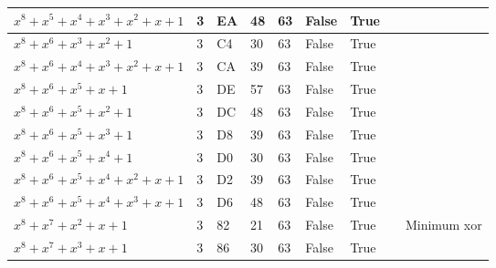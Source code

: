 \begin{footnotesize}
\begin{longtable}{|l|l|l|l|l|l|l|l|l|}
$x^8 + x^5 + x^4 + x^3 + x^2 + x + 1$   & 3             & EA                & 48                  & 63                    & False               & True              &              &                \\ \hline
$x^8 + x^6 + x^3 + x^2 + 1$             & 3             & C4                & 30                  & 63                    & False               & True              &              &                \\ \hline
$x^8 + x^6 + x^4 + x^3 + x^2 + x + 1$   & 3             & CA                & 39                  & 63                    & False               & True              &              &                \\ \hline
$x^8 + x^6 + x^5 + x + 1$               & 3             & DE                & 57                  & 63                    & False               & True              &              &                \\ \hline
$x^8 + x^6 + x^5 + x^2 + 1$             & 3             & DC                & 48                  & 63                    & False               & True              &              &                \\ \hline
$x^8 + x^6 + x^5 + x^3 + 1$             & 3             & D8                & 39                  & 63                    & False               & True              &              &                \\ \hline
$x^8 + x^6 + x^5 + x^4 + 1$             & 3             & D0                & 30                  & 63                    & False               & True              &              &                \\ \hline
$x^8 + x^6 + x^5 + x^4 + x^2 + x + 1$   & 3             & D2                & 39                  & 63                    & False               & True              &              &                \\ \hline
$x^8 + x^6 + x^5 + x^4 + x^3 + x + 1$   & 3             & D6                & 48                  & 63                    & False               & True              &              &                \\ \hline
$x^8 + x^7 + x^2 + x + 1$               & 3             & 82                & 21                  & 63                    & False               & True              &              & Minimum xor    \\ \hline
$x^8 + x^7 + x^3 + x + 1$               & 3             & 86                & 30                  & 63                    & False               & True              &              &                \\ \hline

\end{longtable}
\end{footnotesize}
